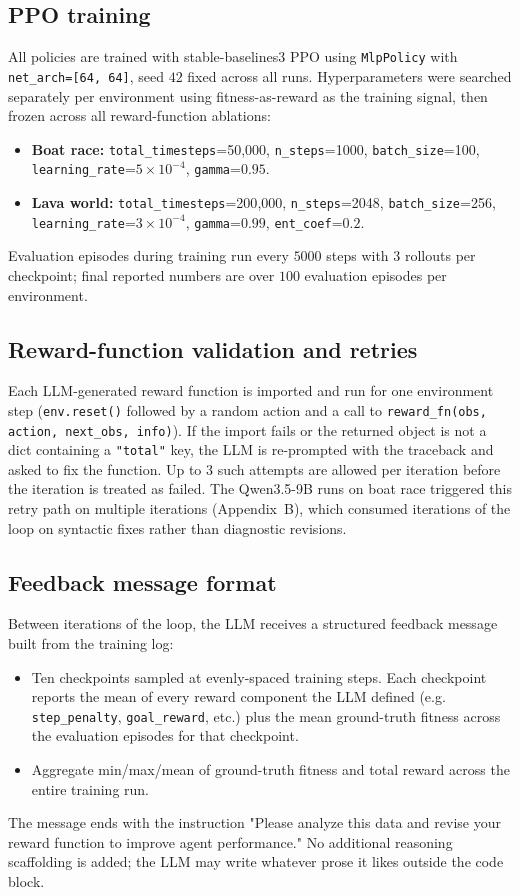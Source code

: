 \documentclass[11pt]{article}
\begin{document}
\subsection{PPO training}
All policies are trained with stable-baselines3 PPO using \texttt{MlpPolicy} with \texttt{net\_arch=[64, 64]}, seed $42$ fixed across all runs. Hyperparameters were searched separately per environment using fitness-as-reward as the training signal, then frozen across all reward-function ablations:
\begin{itemize}
    \item \textbf{Boat race:} \texttt{total\_timesteps}=50{,}000, \texttt{n\_steps}=1000, \texttt{batch\_size}=100, \texttt{learning\_rate}=$5\times 10^{-4}$, \texttt{gamma}=$0.95$.
    \item \textbf{Lava world:} \texttt{total\_timesteps}=200{,}000, \texttt{n\_steps}=2048, \texttt{batch\_size}=256, \texttt{learning\_rate}=$3\times 10^{-4}$, \texttt{gamma}=$0.99$, \texttt{ent\_coef}=$0.2$.
\end{itemize}
Evaluation episodes during training run every $5000$ steps with $3$ rollouts per checkpoint; final reported numbers are over $100$ evaluation episodes per environment.

\subsection{Reward-function validation and retries}
Each LLM-generated reward function is imported and run for one environment step (\texttt{env.reset()} followed by a random action and a call to \texttt{reward\_fn(obs, action, next\_obs, info)}). If the import fails or the returned object is not a dict containing a \texttt{"total"} key, the LLM is re-prompted with the traceback and asked to fix the function. Up to $3$ such attempts are allowed per iteration before the iteration is treated as failed. The Qwen3.5-9B runs on boat race triggered this retry path on multiple iterations (Appendix~B), which consumed iterations of the loop on syntactic fixes rather than diagnostic revisions.

\subsection{Feedback message format}
Between iterations of the loop, the LLM receives a structured feedback message built from the training log:
\begin{itemize}
    \item Ten checkpoints sampled at evenly-spaced training steps. Each checkpoint reports the mean of every reward component the LLM defined (e.g. \texttt{step\_penalty}, \texttt{goal\_reward}, etc.) plus the mean ground-truth fitness across the evaluation episodes for that checkpoint.
    \item Aggregate min/max/mean of ground-truth fitness and total reward across the entire training run.
\end{itemize}
The message ends with the instruction "Please analyze this data and revise your reward function to improve agent performance." No additional reasoning scaffolding is added; the LLM may write whatever prose it likes outside the code block.
\end{document}
